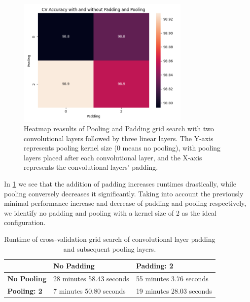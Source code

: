 \begin{figure}[H]
    \centering
    \includegraphics[width=0.75\textwidth]{results/cnn_grid_search/heatmap_grid_search_pp.png}
    \caption{Heatmap reasults of Pooling and Padding grid search with two convolutional layers followed by three linear layers. The Y-axis represents pooling kernel size (0 means no pooling), with pooling layers placed after each convolutional layer, and the X-axis represents the convolutional layers' padding.}
    \label{fig:cnn_pp}
\end{figure}

In \ref{table:runtimes_pp} we see that the addition of padding increases runtimes drastically, while pooling conversely decreases it significantly. Taking into account the previously minimal performance increase and decrease of padding and pooling respectively, we identify no padding and pooling with a kernel size of 2 as the ideal configuration.

\begin{table}[H]
    \centering
    \caption{Runtime of cross-validation grid search of convolutional layer padding and subsequent pooling layers.}
    \label{table:runtimes_pp}
\begin{tabular}{|l|l|l|}
\hline
                    & \textbf{No Padding}      & \textbf{Padding: 2}      \\ \hline
\textbf{No Pooling} & 28 minutes 58.43 seconds & 55 minutes 3.76 seconds \\ \hline
\textbf{Pooling: 2} & 7 minutes 50.80 seconds & 19 minutes 28.03 seconds \\ \hline
\end{tabular}
\end{table}

\newpage
